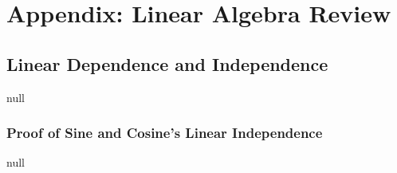 \chapter{Appendix: Linear Algebra Review}
\section{Linear Dependence and Independence}
null
\subsection{Proof of Sine and Cosine's Linear Independence}
null
